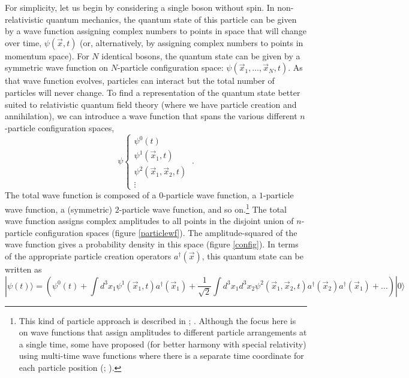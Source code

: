 \documentclass[onecolumn,secnumarabic,amsmath,amssymb,balancelastpage,nofootinbib,12pt]{article}
\begin{document}
For simplicity, let us begin by considering a single boson without spin.  In non-relativistic quantum mechanics, the quantum state of this particle can be given by a wave function assigning complex numbers to points in space that will change over time, $\psi(\vec{x}, t)$ (or, alternatively, by assigning complex numbers to points in momentum space).  For $N$ identical bosons, the quantum state can be given by a symmetric wave function on $N$-particle configuration space: $\psi(\vec{x}_1, \dots, \vec{x}_N, t)$.  As that wave function evolves, particles can interact but the total number of particles will never change.  To find a representation of the quantum state better suited to relativistic quantum field theory (where we have particle creation and annihilation), we can introduce a wave function that spans the various different $n$-particle configuration spaces,
\begin{equation}
\psi \left\{ \begin{matrix}
\psi^{0}(t) \\
\psi^{1}(\vec{x}_1,t) \\
\psi^{2}(\vec{x}_1,\vec{x}_2,t) \\
\vdots
\end{matrix}
\right.\ .
\label{totalWFscalar}
\end{equation}
The total wave function is composed of a $0$-particle wave function, a $1$-particle wave function, a (symmetric) $2$-particle wave function, and so on.\footnote{This kind of particle approach is described in \citet[sec.\ 6f, 6h, and 7c]{schweberQFT}; \citet{dgz2004, durr2005, tumulka2018}.  Although the focus here is on wave functions that assign amplitudes to different particle arrangements at a single time, some have proposed (for better harmony with special relativity) using multi-time wave functions where there is a separate time coordinate for each particle position (\citealp{lienert2017}; \citealp[ch.\ 4]{lienert2020}).}  The total wave function assigns complex amplitudes to all points in the disjoint union of $n$-particle configuration spaces (figure \ref{particlewf}).  The amplitude-squared of the wave function gives a probability density in this space (figure \ref{config}).  In terms of the appropriate particle creation operators $a^\dagger (\vec{x})$, this quantum state can be written as
\begin{equation}
| \psi (t) \rangle = \left(\psi^{0}(t) + \int d^3 x_1 \psi^{1}(\vec{x}_1,t) a^\dagger (\vec{x}_1) + \frac{1}{\sqrt{2}}\int d^3 x_1 d^3 x_2 \psi^{2}(\vec{x}_1,\vec{x}_2,t) a^\dagger (\vec{x}_2) a^\dagger (\vec{x}_1)+\dots \right)| 0 \rangle
\label{WFscalar}
\end{equation}
\end{document}

